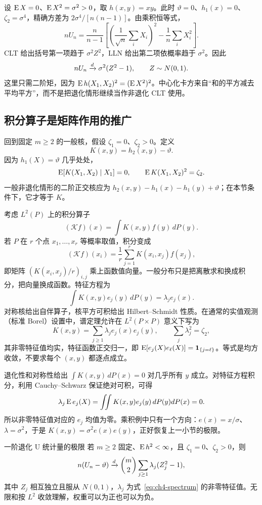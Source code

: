 设 $\operatorname{E} X=0$、$\operatorname{E} X^2=\sigma^2>0$，取 $h(x,y)=xy$。此时 $\vartheta=0$、$h_1(x)=0$、$\zeta_2=\sigma^4$，精确方差为 $2\sigma^4/[n(n-1)]$。由乘积恒等式，
\[
 nU_n=\frac n{n-1}
 \left[\left(\frac1{\sqrt n}\sum_iX_i\right)^2
       -\frac1n\sum_iX_i^2\right].
\]
CLT 给出括号第一项趋于 $\sigma^2Z^2$，LLN 给出第二项依概率趋于 $\sigma^2$。因此
\[
 nU_n\xrightarrow{d}\sigma^2(Z^2-1),\qquad Z\sim N(0,1).
\]
这里只需二阶矩，因为 $\operatorname{E} h(X_1,X_2)^2=(\operatorname{E} X^2)^2$。中心化卡方来自“和的平方减去平均平方”，而不是把退化情形继续当作非退化 CLT 使用。

\subsection{积分算子是矩阵作用的推广}

回到固定 $m\geq2$ 的一般核，假设 $\zeta_1=0$、$\zeta_2>0$。定义
\[
 K(x,y)=h_2(x,y)-\vartheta.
\]
因为 $h_1(X)=\vartheta$ 几乎处处，
\[
 \operatorname{E}[K(X_1,X_2)\mid X_1]=0,
 \qquad\operatorname{E} K(X_1,X_2)^2=\zeta_2.
\]
一般非退化情形的二阶正交核应为 $h_2(x,y)-h_1(x)-h_1(y)+\vartheta$；在本节条件下，它才等于 $K$。

考虑 $L^2(P)$ 上的积分算子
\[
 (\mathcal Kf)(x)=\int K(x,y)f(y)\,dP(y).
\]
若 $P$ 在 $r$ 个点 $x_1,\ldots,x_r$ 等概率取值，积分变成
\[
 (\mathcal Kf)(x_i)=\frac1r\sum_{j=1}^rK(x_i,x_j)f(x_j),
\]
即矩阵 $(K(x_i,x_j)/r)_{i,j}$ 乘上函数值向量。一般分布只是把离散求和换成积分，把向量换成函数。特征方程为
\[
 \int K(x,y)e_j(y)\,dP(y)=\lambda_je_j(x).
\]
对称核给出自伴算子，核平方可积给出 Hilbert--Schmidt 性质。在通常的实值观测（标准 Borel）设置中，谱定理允许在 $L^2(P\times P)$ 意义下写为
\begin{equation}
 K(x,y)=\sum_{j\geq1}\lambda_je_j(x)e_j(y),
 \qquad\sum_j\lambda_j^2=\zeta_2,
 \label{eq:ch4-spectrum}
\end{equation}
其非零特征值均实，特征函数正交归一，即 $\operatorname{E}[e_j(X)e_\ell(X)]=\mathbf 1_{\{j=\ell\}}$。等式是均方收敛，不要求每个 $(x,y)$ 都逐点成立。

退化性和对称性给出 $\int K(x,y)\,dP(x)=0$ 对几乎所有 $y$ 成立。对特征方程积分，利用 Cauchy--Schwarz 保证绝对可积，可得
\[
 \lambda_j\operatorname{E} e_j(X)
 =\iint K(x,y)e_j(y)\,dP(y)dP(x)=0.
\]
所以非零特征值对应的 $e_j$ 均值为零。乘积例中只有一个方向：$e(x)=x/\sigma$、$\lambda=\sigma^2$，于是 $K(x,y)=\sigma^2e(x)e(y)$，正好恢复上一小节的极限。

\begin{definitionbox}{一阶退化 U 统计量的极限}
若 $m\geq2$ 固定、$\operatorname{E} h^2<\infty$，且 $\zeta_1=0$、$\zeta_2>0$，则
\begin{equation}
 n(U_n-\vartheta)\xrightarrow{d}
 \binom m2\sum_{j\geq1}\lambda_j(Z_j^2-1),
 \label{eq:ch4-degenerate-limit}
\end{equation}
其中 $Z_j$ 相互独立且服从 $N(0,1)$，$\lambda_j$ 为式~\eqref{eq:ch4-spectrum} 的非零特征值。无限和按 $L^2$ 收敛理解，权重可以为正也可以为负。
\end{definitionbox}

